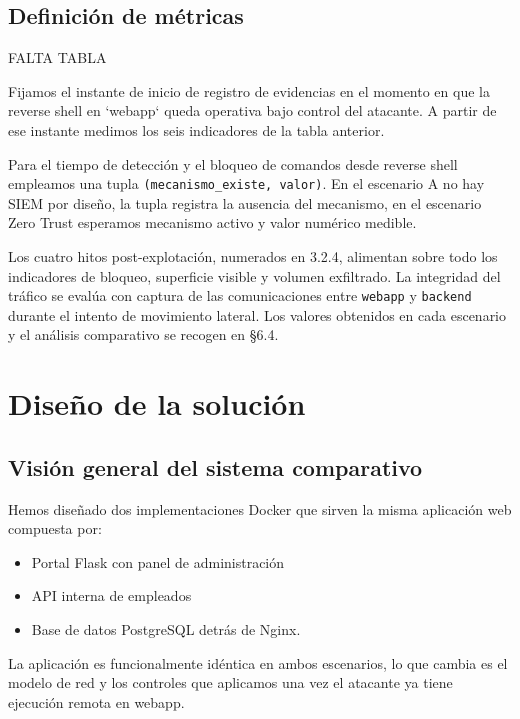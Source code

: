 \documentclass[11pt,spanish,listoffigures,listoftables]{tfgetsinf}
\begin{document}
    \section{Definición de métricas}            %
    FALTA TABLA
    
    Fijamos el instante de inicio de registro de evidencias en el momento en que la reverse shell en `webapp` queda operativa bajo control del atacante. A partir de ese instante medimos los seis indicadores de la tabla anterior.

    Para el tiempo de detección y el bloqueo de comandos desde reverse shell empleamos una tupla \texttt{(mecanismo\_existe, valor)}. En el escenario A no hay SIEM por diseño, la tupla registra la ausencia del mecanismo, en el escenario Zero Trust esperamos mecanismo activo y valor numérico medible.
    
    Los cuatro hitos post-explotación, numerados en 3.2.4, alimentan sobre todo los indicadores de bloqueo, superficie visible y volumen exfiltrado. La integridad del tráfico se evalúa con captura de las comunicaciones entre \texttt{webapp} y \texttt{backend} durante el intento de movimiento lateral. Los valores obtenidos en cada escenario y el análisis comparativo se recogen en §6.4.
    

\chapter{Diseño de la solución}
    
    \section{Visión general del sistema comparativo}
    Hemos diseñado dos implementaciones Docker que sirven la misma aplicación web compuesta por:
    \begin{itemize}
        \item Portal Flask con panel de administración
        \item API interna de empleados
        \item Base de datos PostgreSQL detrás de Nginx. 
    \end{itemize}
    La aplicación es funcionalmente idéntica en ambos escenarios, lo que cambia es el modelo de red y los controles que aplicamos una vez el atacante ya tiene ejecución remota en webapp.
    
\end{document}
